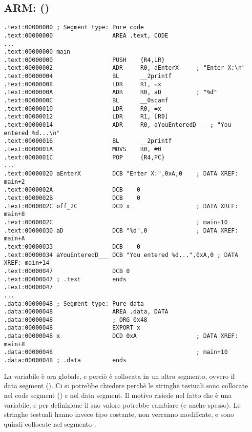 \subsection{ARM: \OptimizingKeilVI (\ThumbMode)}

\begin{lstlisting}
.text:00000000 ; Segment type: Pure code
.text:00000000                 AREA .text, CODE
...
.text:00000000 main
.text:00000000                 PUSH    {R4,LR}
.text:00000002                 ADR     R0, aEnterX     ; "Enter X:\n"
.text:00000004                 BL      __2printf
.text:00000008                 LDR     R1, =x
.text:0000000A                 ADR     R0, aD          ; "%d"
.text:0000000C                 BL      __0scanf
.text:00000010                 LDR     R0, =x
.text:00000012                 LDR     R1, [R0]
.text:00000014                 ADR     R0, aYouEnteredD___ ; "You entered %d...\n"
.text:00000016                 BL      __2printf
.text:0000001A                 MOVS    R0, #0
.text:0000001C                 POP     {R4,PC}
...
.text:00000020 aEnterX         DCB "Enter X:",0xA,0    ; DATA XREF: main+2
.text:0000002A                 DCB    0
.text:0000002B                 DCB    0
.text:0000002C off_2C          DCD x                   ; DATA XREF: main+8
.text:0000002C                                         ; main+10
.text:00000030 aD              DCB "%d",0              ; DATA XREF: main+A
.text:00000033                 DCB    0
.text:00000034 aYouEnteredD___ DCB "You entered %d...",0xA,0 ; DATA XREF: main+14
.text:00000047                 DCB 0
.text:00000047 ; .text         ends
.text:00000047
...
.data:00000048 ; Segment type: Pure data
.data:00000048                 AREA .data, DATA
.data:00000048                 ; ORG 0x48
.data:00000048                 EXPORT x
.data:00000048 x               DCD 0xA                 ; DATA XREF: main+8
.data:00000048                                         ; main+10
.data:00000048 ; .data         ends
\end{lstlisting}

La variabile  è ora globale, e perciò è collocata in un altro segmento, ovvero il data segment ().
Ci si potrebbe chiedere perchè le stringhe testuali sono collocate nel code segment () e  nel data segment.
Il motivo risiede nel fatto che  è una variabile, e per definizione il suo valore potrebbe cambiare (e anche spesso).
Le stringhe testuali hanno invece tipo costante, non verranno modificate, e sono quindi collocate nel segmento .
\myindex{\RAM}
\myindex{\ROM}

